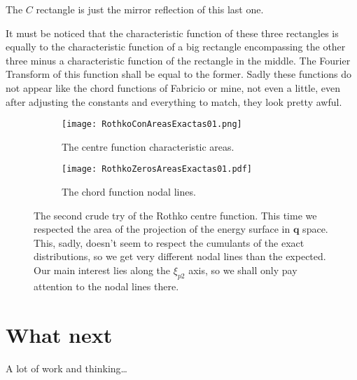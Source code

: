 \documentclass[a4paper,12pt]{article}
\newcommand{\qfase}{\mathbf{q}}
\begin{document}
The $C$ rectangle is just the mirror reflection of this last one. 

It must be noticed that the characteristic function of these
three rectangles is equally to the characteristic function of a big
rectangle encompassing the other three minus a characteristic function
of the rectangle in the middle. The Fourier Transform of this
function shall be equal to the former. Sadly these functions
do not appear like the chord functions
of Fabricio or mine, not even a little, even after adjusting the
constants and everything to match, they look pretty awful.


\begin{figure}[H]
  \centering
  \begin{subfigure}[b]{0.45\textwidth}
    \centering
          \texttt{[image: RothkoConAreasExactas01.png]}
                \caption{The centre function characteristic areas.}
                \label{FabZeros}
  \end{subfigure}%
\begin{subfigure}[b]{0.45\textwidth}
    \centering
          \texttt{[image: RothkoZerosAreasExactas01.pdf]}
                \caption{The chord function nodal lines.}
                \label{KarelZeros}
  \end{subfigure}%
\caption{The second crude try of the Rothko centre function. This time
we respected the area of the projection of the energy surface in $\qfase$ space.
This, sadly, doesn't seem to respect the cumulants of the exact distributions,
so we get very different nodal lines than the expected. Our main interest
lies along the $\xi_{p2}$ axis, so we shall only pay attention
to the nodal lines there. 
}
\label{RectangulosAreas}
\end{figure}

\section{What next}

A lot of work and thinking\ldots
\end{document}
